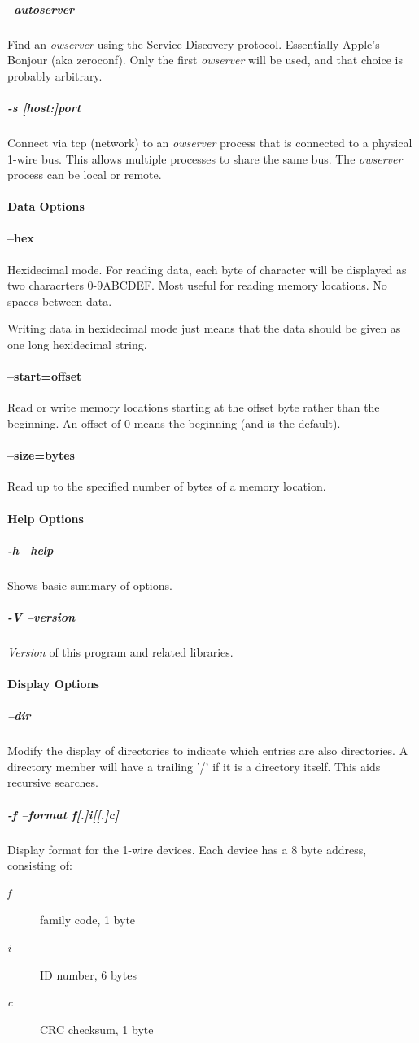 \subparagraph*{--autoserver}Find
an  \textit{owserver} using the Service Discovery protocol. Essentially Apple's Bonjour
(aka zeroconf). Only the first  \textit{owserver}  will be used, and that choice
is probably arbitrary. 
\subparagraph*{-s [host:]port}Connect via tcp (network) to an \textit{owserver}
process that is connected to a physical 1-wire bus. This allows multiple
processes to share the same bus. The \textit{owserver} process can be local or remote.

\paragraph*{Data Options}

\paragraph*{--hex}
Hexidecimal mode. For reading data, each byte of character
will be displayed as two characrters 0-9ABCDEF. Most useful for reading memory
locations. No spaces between data. 

Writing data in hexidecimal mode just
means that the data should be given as one long hexidecimal string. 
\paragraph*{--start=offset}
Read
or write memory locations starting at the offset byte rather than the beginning.
An offset of 0 means the beginning (and is the default). 


\paragraph*{--size=bytes}
Read
up to the specified number of bytes of a memory location. 
\paragraph*{Help Options}

\subparagraph*{-h
--help}Shows basic summary of options. 
\subparagraph*{-V --version}\textit{Version} of this program and
related libraries. 
\paragraph*{Display Options}

\subparagraph*{--dir}Modify the display of directories to
indicate which entries are also directories. A directory member will have
a trailing '/' if it is a directory itself. This aids recursive searches. 
\subparagraph*{-f
--format \dq{}f[.]i[[.]c]\dq{}}Display format for the 1-wire devices. Each device has
a 8 byte address, consisting of: \begin{description}
\item [\textit{f} ] family code, 1 byte 
\item [\textit{i} ] ID number, 6 bytes

\item [\textit{c} ] CRC checksum, 1 byte 
\end{description}


